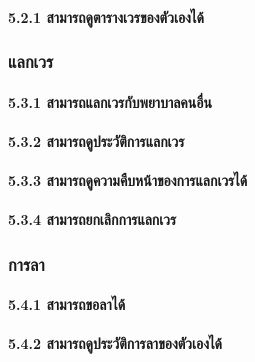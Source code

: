 \hspace{2.5cm}\paragraph{5.2.1 สามารถดูตารางเวรของตัวเองได้}

\hspace{1cm}\subsubsection{แลกเวร}

\hspace{2.5cm}\paragraph{5.3.1 สามารถแลกเวรกับพยาบาลคนอื่น}

\hspace{2.5cm}\paragraph{5.3.2 สามารถดูประวัติการแลกเวร}

\hspace{2.5cm}\paragraph{5.3.3 สามารถดูความคืบหน้าของการแลกเวรได้}

\hspace{2.5cm}\paragraph{5.3.4 สามารถยกเลิกการแลกเวร}

\hspace{1cm}\subsubsection{การลา}

\hspace{2.5cm}\paragraph{5.4.1 สามารถขอลาได้}

\hspace{2.5cm}\paragraph{5.4.2 สามารถดูประวัติการลาของตัวเองได้}

